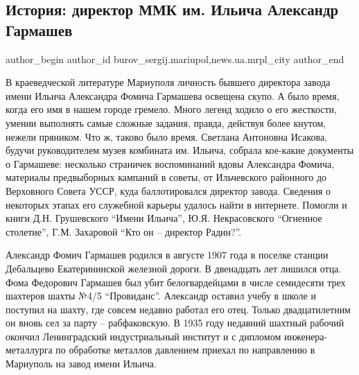  
 
 
 
 
 
\subsection{История: директор ММК им. Ильича Александр Гармашев}
\label{sec:15_02_2017.stz.news.ua.mrpl_city.1.istoria_direktor_mmk_im_iljicha_aleksandr_garmashev}
 
\ifcmt
 author_begin
   author_id burov_sergij.mariupol,news.ua.mrpl_city
 author_end
\fi


В краеведческой литературе Мариуполя личность бывшего директора завода имени
Ильича Александра Фомича Гармашева освещена скупо. А было время, когда его имя
в нашем городе гремело. Много легенд ходило о его жесткости, умении выполнять
самые сложные задания, правда, действуя более кнутом, нежели пряником. Что ж,
таково было время. Светлана Антоновна Исакова, будучи руководителем музея
комбината им. Ильича, собрала кое-какие документы о Гармашеве: несколько
страничек воспоминаний вдовы Александра Фомича, материалы предвыборных кампаний
в советы, от Ильчевского районного до Верховного Совета УССР, куда
баллотировался директор завода. Сведения о некоторых этапах  его служебной
карьеры удалось найти в интернете. Помогли и книги Д.Н. Грушевского \enquote{Имени
Ильича}, Ю.Я. Некрасовского \enquote{Огненное столетие}, Г.М. Захаровой \enquote{Кто он –
директор Радин?}.

Александр Фомич Гармашев родился в августе 1907 года в поселке станции
Дебальцево Екатерининской железной дороги. В двенадцать лет лишился отца. Фома
Федорович Гармашев был убит белогвардейцами в числе семидесяти трех шахтеров
шахты №4/5 \enquote{Провиданс}. Александр оставил учебу в школе и поступил на шахту,
где совсем недавно работал его отец. Только двадцатилетним он вновь сел за
парту – рабфаковскую. В 1935 году недавний шахтный рабочий окончил
Ленинградский индустриальный институт и с дипломом инженера-металлурга по
обработке металлов давлением приехал по направлению в Мариуполь на завод имени
Ильича. 

